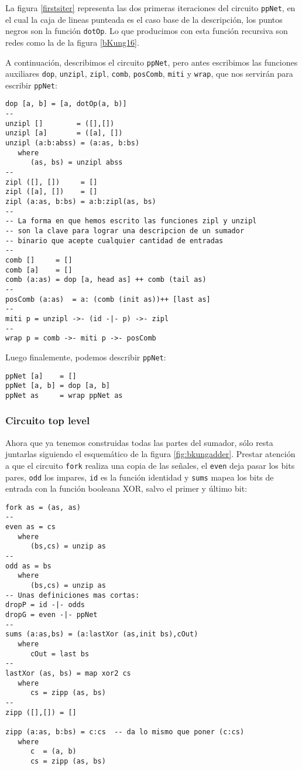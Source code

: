 La figura \ref{firstsiter} representa las dos primeras iteraciones del circuito \verb|ppNet|, en el cual la caja de lineas punteada es el caso base de la descripción, los puntos negros son la función \verb|dotOp|. Lo que producimos con esta función recursiva son redes como la de la figura \ref{bKung16}.

A continuación, describimos el circuito \verb|ppNet|, pero antes escribimos las funciones auxiliares \verb|dop|, \verb|unzipl|, \verb|zipl|, \verb|comb|, \verb|posComb|, \verb|miti| y \verb|wrap|, que nos servirán para escribir \verb|ppNet|:


\begin{lstlisting}
dop [a, b] = [a, dotOp(a, b)]
--
unzipl []        = ([],[])
unzipl [a]       = ([a], [])
unzipl (a:b:abss) = (a:as, b:bs)
   where
      (as, bs) = unzipl abss
--
zipl ([], [])     = []
zipl ([a], [])    = []
zipl (a:as, b:bs) = a:b:zipl(as, bs)
--
-- La forma en que hemos escrito las funciones zipl y unzipl 
-- son la clave para lograr una descripcion de un sumador 
-- binario que acepte cualquier cantidad de entradas
--
comb []     = []
comb [a]    = []
comb (a:as) = dop [a, head as] ++ comb (tail as)
--
posComb (a:as)  = a: (comb (init as))++ [last as]
--
miti p = unzipl ->- (id -|- p) ->- zipl
--
wrap p = comb ->- miti p ->- posComb 
\end{lstlisting}

\noindent Luego finalemente, podemos describir {\verb|ppNet|}:

\begin{lstlisting}
ppNet [a]    = []
ppNet [a, b] = dop [a, b]
ppNet as     = wrap ppNet as
\end{lstlisting}


\subsubsection{Circuito top level}
Ahora que ya tenemos construidas todas las partes del sumador, sólo resta juntarlas siguiendo el esquemático de la figura \ref{fig:bkungadder}. Prestar atención a que el circuito \verb|fork| realiza una copia de las señales, el \verb|even| deja pasar los bits pares, \verb|odd| los impares, \verb|id| es la función identidad y \verb|sums| mapea los bits de entrada con la función booleana XOR, salvo el primer y último bit:

\begin{lstlisting}
fork as = (as, as)
--
even as = cs
   where
      (bs,cs) = unzip as
--
odd as = bs
   where
      (bs,cs) = unzip as
-- Unas definiciones mas cortas:
dropP = id -|- odds
dropG = even -|- ppNet
--
sums (a:as,bs) = (a:lastXor (as,init bs),cOut)
   where
      cOut = last bs
--
lastXor (as, bs) = map xor2 cs
   where
      cs = zipp (as, bs)
--
zipp ([],[]) = []

zipp (a:as, b:bs) = c:cs  -- da lo mismo que poner (c:cs)
   where
      c  = (a, b)
      cs = zipp (as, bs)
\end{lstlisting}

